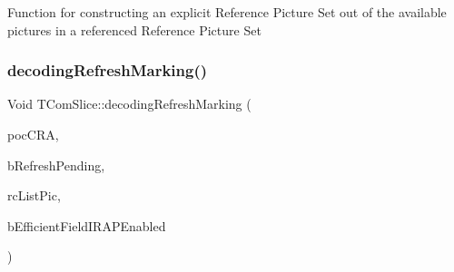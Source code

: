 Function for constructing an explicit Reference Picture Set out of the available pictures in a referenced Reference Picture Set \mbox{\label{class_t_com_slice_aa4a3c623876f4f967def7faf17ad8453}} 
\subsubsection{\texorpdfstring{decoding\+Refresh\+Marking()}{decodingRefreshMarking()}}
{\footnotesize\ttfamily Void T\+Com\+Slice\+::decoding\+Refresh\+Marking (\begin{DoxyParamCaption}\item[{Int \&}]{poc\+C\+RA,  }\item[{Bool \&}]{b\+Refresh\+Pending,  }\item[{\hyperlink{class_t_com_list}{T\+Com\+List}$<$ \hyperlink{class_t_com_pic}{T\+Com\+Pic} $\ast$$>$ \&}]{rc\+List\+Pic,  }\item[{const bool}]{b\+Efficient\+Field\+I\+R\+A\+P\+Enabled }\end{DoxyParamCaption})}

